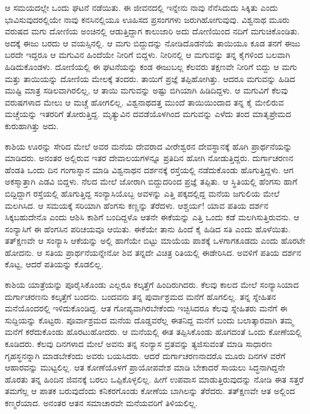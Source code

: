 ಆ ಸಮಯದಲ್ಲೇ ಒಂದು ಘಟನೆ ನಡೆಯಿತು. ಈ ಜೀವನದಲ್ಲಿ ಇನ್ನೇನು ನಾವು ನೆನೆಸಿದುದು ಸಿಕ್ಕಿತು ಎಂದು ಭಾವಿಸುವುದರಲ್ಲಿಯೇ ನಾವು ಕನಸಿನಲ್ಲಿಯೂ ಊಹಿಸದ ಪ್ರಸಂಗಗಳು ಜರುಗಿಹೋಗುವುವು. ವಿಶ್ವನಾಥ ಮೂರು ವರುಷದ ಮಗು ದೋಣಿಯ ಅಂಚಿನಲ್ಲಿ ಆಡುತ್ತಿದ್ದಾಗ ಕಾಲುಜಾರಿ ಅದು ದೋಣಿಯಿಂದ ನದಿಗೆ ಮಗುಚಿಕೊಂಡಿತು. ಅದಕ್ಕೆ ಈಜು ಬರದು ಆ ವಯಸ್ಸಿನಲ್ಲಿ. ಆ ಮಗು ಬಿದ್ದುದನ್ನು ನೋಡಿದೊಡನೆಯೆ ತಾಯಿಯೂ ಕೂಡ ತನಗೆ ಈಜು ಬರದೇ ಇದ್ದರೂ ಆ ಮಗುವಿನ ಹಿಂದೆಯೇ ನೀರಿಗೆ ಬಿದ್ದಳು. ನೀರಿನಲ್ಲಿ ಆ ಮಗುವನ್ನು ತನ್ನ ಕೈಗಳಿಂದ ಬಲವಾಗಿ ಹಿಡಿದುಕೊಂಡಳು. ದೋಣಿಯಲ್ಲಿ ಈ ಘಟನೆಯನ್ನು ಕಂಡ ಈಜುಬಲ್ಲ ಕೆಲವರು ತಕ್ಷಣವೇ ನೀರಿಗೆ ಬಿದ್ದು ಆ ಮಗು ಮತ್ತು ತಾಯಿಯನ್ನು ದೋಣಿಯ ಮೇಲಕ್ಕೆ ತಂದರು. ತಾಯಿಗೆ ಪ್ರಜ್ಞೆ ತಪ್ಪಿಹೋಗಿತ್ತು. ಆದರೂ ಮಗುವನ್ನು ಹಿಡಿದ ಮುಷ್ಟಿ ಮಾತ್ರ ಸಡಿಲವಾಗಿರಲಿಲ್ಲ, ಆ ತಾಯಿ ಮಗುವನ್ನು ಅಷ್ಟು ಬಿಗಿಯಾಗಿ ಹಿಡಿದಿದ್ದಳು. ಆ ಮಗುವಿಗೆ ಕೆಲವು ವರುಷಗಳಾದ ಮೇಲು ಆ ಮಚ್ಚೆ ಹೋಗಲಿಲ್ಲ. ವಿಶ್ವನಾಥದತ್ತ ಮುಂದೆ ತಾಯಿಯಿಂದಾದ ತನ್ನ ಕೈ ಮೇಲಿರುವ ಮಚ್ಚೆಯನ್ನು ಇತರರಿಗೆ ತೋರುತ್ತಿದ್ದ. ಮೃತ್ಯುವಿನ ದವಡೆಯೊಳಗಿಂದ ಮಗುವನ್ನು ಎಳೆದು ತಂದ ಮಾತೃಪ್ರೇಮದ ಕುರುಹಾಗಿತ್ತು ಅದು.

ಕಾಶಿಯ ಊರನ್ನು ಸೇರಿದ ಮೇಲೆ ಅವರ ಮನೆಯ ದೇವರಾದ ವೀರೇಶ್ವರನ ದೇವಸ್ಥಾನಕ್ಕೆ ಹೊಗಿ ಪ್ರಾರ್ಥನೆಯನ್ನು ಮಾಡಿದರು. ಅನಂತರ ಅಲ್ಲಿರುವ ಇತರ ದೇವಾಲಯಗಳನ್ನೂ ಪ್ರತಿದಿನ ಹೋಗಿ ನೋಡುತ್ತಿದ್ದರು. ದುರ್ಗಾಚರಣನ ಹೆಂಡತಿ ಒಂದು ದಿನ ಗಂಗಾಸ್ನಾನ ಮಾಡಿ ವಿಶ್ವನಾಥನ ದರ್ಶನಕ್ಕೆ ರಸ್ತೆಯಲ್ಲಿ ನಡೆದುಕೊಂಡು ಹೊಗುತ್ತಿದ್ದಳು. ಆಗ ಅಕಸ್ಮಾತ್ತಾಗಿ ಎಡವಿ ಬಿದ್ದಳು. ನೆಲದ ಮೇಲೆ ಜೋರಾಗಿ ಬಿದ್ದುದರಿಂದ ಪ್ರಜ್ಞೆ ತಪ್ಪಿತು. ಆ ಸ್ಥಿತಿಯಲ್ಲಿ ಹೆಂಗಸು ಹಾಗೆ ಬಿದ್ದಿದ್ದಾಗ ರಸ್ತೆಯಲ್ಲಿ ಹೊಗುತ್ತಿದ್ದ ಸಂನ್ಯಾಸಿಯೊಬ್ಬ ಅವಳನ್ನು ಎತ್ತಿ ಪಕ್ಕದಲ್ಲಿದ್ದ ಮನೆಯ ಜಗುಲಿಯ ಮೇಲೆ ಮಲಗಿಸಿದ. ಆ ಸಮಯಕ್ಕೆ ಸರಿಯಾಗಿ ಹೆಂಗಸು ಕಣ್ಣನ್ನು ತೆರೆದಳು. ಆಶ್ಚರ್ಯ! ಯಾವ ಪತಿಯ ದರ್ಶನ ಸಿಕ್ಕಬಹುದೇನೊ ಎಂದು ಆಶಿಸಿ ಕಾಶಿಗೆ ಬಂದಿದ್ದಳೊ ಆತನೇ ಈಕೆಯನ್ನು ಎತ್ತಿ ಒಂದು ಕಡೆ ಮಲಗಿಸುತ್ತಿರುವನು. ಆ ಸಂನ್ಯಾಸಿಗೆ ಈ ಹೆಂಗಸಿನ ಪರಿಚಯವೂ ಆಯಿತು. ಈಕೆಯೇ ತಾನು ಹಿಂದೆ ಕೈ ಹಿಡಿದ ಸತಿ ಎಂದು ಹೊಳೆಯಿತು. ತತ್‍ಕ್ಷಣವೇ ಆ ಸಂನ್ಯಾಸಿ ಆಕೆಯನ್ನು ಅಲ್ಲಿ ಹಾಗೆಯೇ ಬಿಟ್ಟು ಮಾಯೆಯ ಪಾಶಕ್ಕೆ ಒಳಗಾಗ\-ಕೂಡದು ಎಂದು ಹೊರಟೇ ಹೋದನು. ಆ ಸತಿಯ ಪ್ರಾರ್ಥನೆಯನ್ನೇನೋ ಶಿವ ತನ್ನದೇ ವಿಚಿತ್ರ ರಿತಿಯಲ್ಲಿ ಈಡೇರಿಸಿದ. ಅವಳಿಗೆ ಪತಿಯ ದರ್ಶನ ಕೊಟ್ಟ, ಆದರೆ ಪತಿಯನ್ನು ಕೊಡಲಿಲ್ಲ.

ಕಾಶಿಯ ಯಾತ್ರೆಯನ್ನು ಪೂರೈಸಿಕೊಂಡು ಎಲ್ಲರೂ ಕಲ್ಕತ್ತೆಗೆ ಹಿಂದಿರುಗಿದರು. ಕೆಲವು ಕಾಲದ ಮೇಲೆ ಸಂನ್ಯಾಸಿಯಾದ ದುರ್ಗಾಚರಣನು ಕಲ್ಕತ್ತೆಗೆ ಬಂದನು. ಬಂದವನು ತನ್ನ ಪುರ್ವಾಶ್ರಮದ ಮನೆಗೆ ಹೊಗಲಿಲ್ಲ. ತನ್ನ ಸ್ನೇಹಿತನ ಮನೆಯೊಂದರಲ್ಲಿ ಇಳಿದುಕೊಂಡಿದ್ದ. ಆತ ಗೋಪ್ಯವಾಗಿರಬೇಕೆಂದು ಇಚ್ಛಿಸಿದರೂ ಕೆಲವು ಸ್ನೇಹಿತರು ಮನೆಗೆ ಈ ಸುದ್ದಿಯನ್ನು ಕೊಟ್ಟರು. ಪೂರ್ವಾಶ್ರಮದ ಮನೆಯ ದೊಡ್ಡವರೆಲ್ಲ ಈತನಿದ್ದ ಮನೆಗೆ ಬಂದು ಬಲಾತ್ಕಾರವಾಗಿ ತಮ್ಮ ಮನೆಗೆ ಕರೆದುಕೊಂಡು ಹೊರಟುಹೋದರು. ಆ ಮನೆಯಲ್ಲಿ ಈತ ತಪ್ಪಿಸಿಕೊಂಡು ಹೊಗದಂತೆ ಒಂದು ಕೋಣೆಯಲ್ಲಿ ಕೂಡಿದರು. ಕೆಲವು ದಿನಗಳಾದ ಮೇಲೆ ಅವನು ತನ್ನ ಸಂನ್ಯಾಸ ವ್ರತವನ್ನು ತ್ಯಜಿಸುವಂತೆ ಮಾಡಿ ಸಾಧಾರಣ ಗೃಹಸ್ಥನನ್ನಾಗಿ ಮಾಡಬೇಕೆಂದು ಅವರು ಬಯಸಿದರು. ಆದರೆ ದುರ್ಗಾಚರಣನಾದರೊ ಮೂರು ದಿನಗಳ ವರೆಗೆ ಆಹಾರವನ್ನು ಮುಟ್ಟಲಿಲ್ಲ. ಆತ ಕೋಣೆಯೊಳಗೆ ಪ್ರಾಯೋಪವೇಶ ಮಾಡಿ ಬೇಕಾದರೆ ಸಾಯಲು ಸಿದ್ಧನಾಗಿದ್ದನೇ ಹೊರತು ತನ್ನ ಹಿಂದಿನ ಜಿವನಕ್ಕೆ ಬರಲು ಒಪ್ಪಿಕೊಳ್ಳಲಿಲ್ಲ. ಹೀಗೆ ಉಪವಾಸ ಮಾಡುತ್ತಿರುವುದನ್ನು ನೋಡಿ ಈತ ಸತ್ತರೆ ತಮಗೆಲ್ಲ ಆ ಪಾತಕ ಬರುವುದೆಂದು ಕನಿಕರಗೊಂಡು ಕೋಣೆಯ ಬಾಗಿಲನ್ನು ತೆರೆದರು. ತತ್‍ಕ್ಷಣವೇ ಆತ ಅಲ್ಲಿಂದ ಕಣ್ಮರೆಯಾದ. ಅನಂತರ ಆತನ ಸಮಾಚಾರವೇ ಮನೆಯವರಿಗೆ ತಿಳಿಯಲಿಲ್ಲ.

